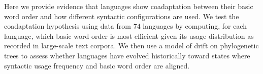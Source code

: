 \documentclass[9pt,twocolumn,twoside,lineno]{pnas-new}
\begin{document}





Here we provide evidence that languages show coadaptation between their basic word order and how different syntactic configurations are used.
We test the coadaptation hypothesis using data from 74 languages by computing, for each language, which basic word order is most efficient given its usage distribution as recorded in large-scale text corpora.
We then use a model of drift on phylogenetic trees to assess whether languages have evolved historically toward states where syntactic usage frequency and basic word order are aligned.
\end{document}
